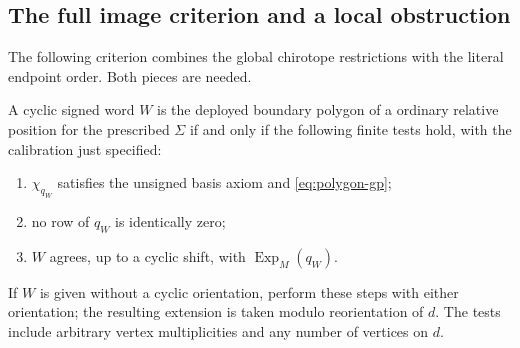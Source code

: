 \subsection{The full image criterion and a local obstruction}
The following criterion combines the global chirotope restrictions
with the literal endpoint order. Both pieces are needed.

\begin{proposition}\label{prop:polygon-image}

A cyclic signed word $W$ is the deployed boundary polygon of a
ordinary relative position for the prescribed $\Sigma$ if and
only if the following finite tests hold, with the calibration just
specified:
\begin{enumerate}
 \item $\chi_{q_W}$ satisfies the unsigned basis axiom and
       \eqref{eq:polygon-gp};
 \item no row of $q_W$ is identically zero;
 \item $W$ agrees, up to a cyclic shift, with
       $\operatorname{Exp}_M(q_W)$.
\end{enumerate}
If $W$ is given without a cyclic orientation, perform these steps with
either orientation; the resulting extension is taken modulo
reorientation of $d$.  The tests include arbitrary vertex
multiplicities and any number of vertices on $d$.
\end{proposition}

